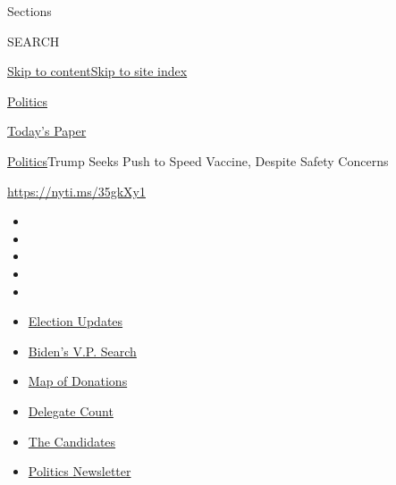 Sections

SEARCH

\protect\hyperlink{site-content}{Skip to
content}\protect\hyperlink{site-index}{Skip to site index}

\href{https://www.nytimes3xbfgragh.onion/section/politics}{Politics}

\href{https://myaccount.nytimes3xbfgragh.onion/auth/login?response_type=cookie\&client_id=vi}{}

\href{https://www.nytimes3xbfgragh.onion/section/todayspaper}{Today's
Paper}

\href{/section/politics}{Politics}\textbar{}Trump Seeks Push to Speed
Vaccine, Despite Safety Concerns

\url{https://nyti.ms/35gkXy1}

\begin{itemize}
\item
\item
\item
\item
\item
\end{itemize}

\begin{itemize}
\item
  \href{https://www.nytimes3xbfgragh.onion/2020/07/31/us/elections/biden-vs-trump.html?action=click\&pgtype=Article\&state=default\&region=TOP_BANNER\&context=storylines_menu}{Election
  Updates}
\item
  \href{https://www.nytimes3xbfgragh.onion/article/biden-vice-president-2020.html?action=click\&pgtype=Article\&state=default\&region=TOP_BANNER\&context=storylines_menu}{Biden's
  V.P. Search}
\item
  \href{https://www.nytimes3xbfgragh.onion/interactive/2020/07/24/us/politics/trump-biden-campaign-donors.html?action=click\&pgtype=Article\&state=default\&region=TOP_BANNER\&context=storylines_menu}{Map
  of Donations}
\item
  \href{https://www.nytimes3xbfgragh.onion/interactive/2020/us/elections/delegate-count-primary-results.html?action=click\&pgtype=Article\&state=default\&region=TOP_BANNER\&context=storylines_menu}{Delegate
  Count}
\item
  \href{https://www.nytimes3xbfgragh.onion/interactive/2019/us/politics/2020-presidential-candidates.html?action=click\&pgtype=Article\&state=default\&region=TOP_BANNER\&context=storylines_menu}{The
  Candidates}
\item
  \href{https://www.nytimes3xbfgragh.onion/newsletters/politics?action=click\&pgtype=Article\&state=default\&region=TOP_BANNER\&context=storylines_menu}{Politics
  Newsletter}
\end{itemize}

